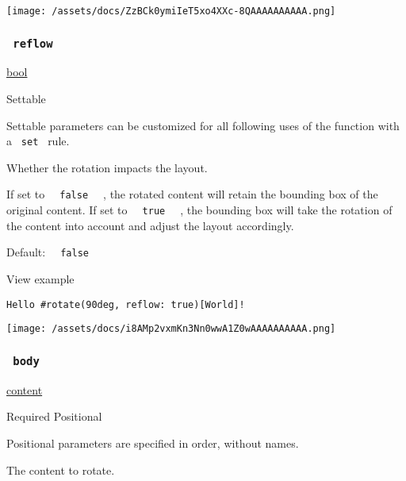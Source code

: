 \texttt{[image: /assets/docs/ZzBCk0ymiIeT5xo4XXc-8QAAAAAAAAAA.png]}

\subsubsection{\texorpdfstring{\texttt{\ reflow\ }}{ reflow }}\label{parameters-reflow}

\href{/docs/reference/foundations/bool/}{bool}

{{ Settable }}

\label{parameters-reflow-settable-tooltip}
Settable parameters can be customized for all following uses of the
function with a \texttt{\ set\ } rule.

Whether the rotation impacts the layout.

If set to \texttt{\ }{\texttt{\ false\ }}\texttt{\ } , the rotated
content will retain the bounding box of the original content. If set to
\texttt{\ }{\texttt{\ true\ }}\texttt{\ } , the bounding box will take
the rotation of the content into account and adjust the layout
accordingly.

Default: \texttt{\ }{\texttt{\ false\ }}\texttt{\ }


View example

\begin{verbatim}
Hello #rotate(90deg, reflow: true)[World]!
\end{verbatim}

\texttt{[image: /assets/docs/i8AMp2vxmKn3Nn0wwA1Z0wAAAAAAAAAA.png]}

\subsubsection{\texorpdfstring{\texttt{\ body\ }}{ body }}\label{parameters-body}

\href{/docs/reference/foundations/content/}{content}

{Required} {{ Positional }}

\label{parameters-body-positional-tooltip}
Positional parameters are specified in order, without names.

The content to rotate.

\href{/docs/reference/layout/repeat/}{\pandocbounded{}}

